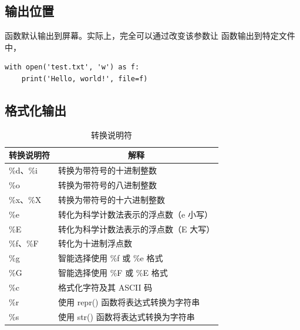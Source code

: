 \subsection{输出位置}
 函数默认输出到屏幕。实际上，完全可以通过改变该参数让  函数输出到特定文件中，
\begin{lstlisting}[style=demostyle,numbers=none]
with open('test.txt', 'w') as f:
    print('Hello, world!', file=f)
\end{lstlisting}

\subsection{格式化输出}
\begin{table}[]
\begin{tabular}{|l|l|}
\hline
\multicolumn{1}{|c|}{\textbf{转换说明符}} & \multicolumn{1}{c|}{\textbf{解释}} \\ \hline
\%d、\%i                              & 转换为带符号的十进制整数                     \\ \hline
\%o                                  & 转换为带符号的八进制整数                     \\ \hline
\%x、\%X                              & 转换为带符号的十六进制整数                    \\ \hline
\%e                                  & 转化为科学计数法表示的浮点数（e 小写）             \\ \hline
\%E                                  & 转化为科学计数法表示的浮点数（E 大写）             \\ \hline
\%f、\%F                              & 转化为十进制浮点数                        \\ \hline
\%g                                  & 智能选择使用 \%f 或 \%e 格式              \\ \hline
\%G                                  & 智能选择使用 \%F 或 \%E 格式              \\ \hline
\%c                                  & 格式化字符及其 ASCII 码                  \\ \hline
\%r                                  & 使用 repr() 函数将表达式转换为字符串           \\ \hline
\%s                                  & 使用 str() 函数将表达式转换为字符串            \\ \hline
\end{tabular}
\caption{转换说明符}
\end{table}

